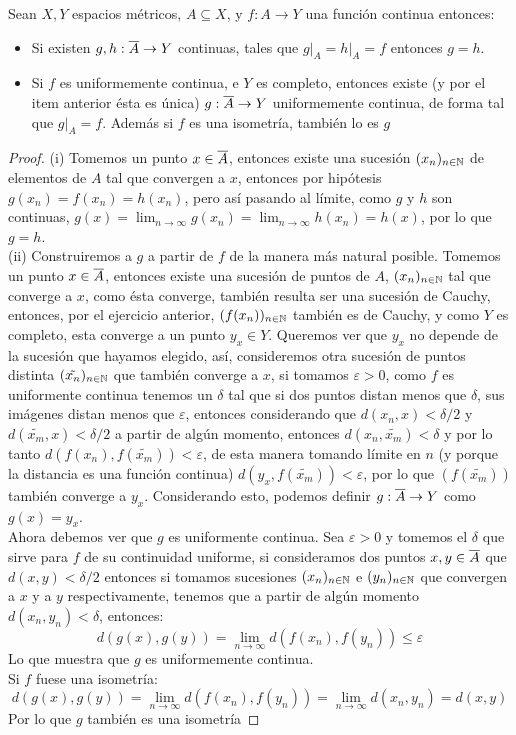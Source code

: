 \documentclass[12pt,a4paper]{book}
\begin{document}
\begin{teo}
Sean $X,Y$ espacios métricos, $A \subseteq X$, y $f:A \rightarrow Y$ una función continua entonces:
\begin{itemize}
\item[i] Si existen $g,h:\overline{A} \rightarrow Y$ continuas, tales que $g\vert_A = h\vert_A = f$ entonces $g = h$.
\item[ii] Si $f$ es uniformemente continua, e $Y$ es completo, entonces existe (y por el item anterior ésta es única) $g : \overline{A} \rightarrow Y$  uniformemente continua, de forma tal que $g\vert_A =f$. Además si $f$ es una isometría, también lo es $g$
\end{itemize}
\begin{proof}
(i) Tomemos un punto $x \in \overline{A}$, entonces existe una sucesión $(x_n)_{{n} \in \mathbb{N}}$ de elementos de $A$ tal que convergen a $x$, entonces por hipótesis $g(x_n)=f(x_n)=h(x_n)$, pero así pasando al límite, como $g$ y $h$ son continuas, $g(x) = \displaystyle \lim_{n\to \infty} g(x_n) = \lim_{n\to \infty} h(x_n) = h(x)$, por lo que $g=h$.\\
(ii) Construiremos a $g$ a partir de $f$ de la manera más natural posible. Tomemos un punto $x \in \overline{A}$, entonces existe una sucesión de puntos de $A$, $(x_n)_{{n} \in \mathbb{N}}$ tal que converge a $x$, como ésta converge, también resulta ser una sucesión de Cauchy, entonces, por el ejercicio anterior, $(f(x_n))_{{n} \in \mathbb{N}}$ también es de Cauchy, y como $Y$ es completo, esta converge a un punto $y_x \in Y$. Queremos ver que $y_x$ no depende de la sucesión que hayamos elegido, así, consideremos otra sucesión de puntos distinta $(\tilde{x_n})_{{n} \in \mathbb{N}}$ que también converge a $x$, si tomamos $\varepsilon >0$, como $f$ es uniformente continua tenemos un $\delta$ tal que si dos puntos distan menos que $\delta$, sus imágenes distan menos que $\varepsilon$, entonces considerando que $d(x_n,x)< \delta/2$ y $d(\tilde{x_m},x) < \delta/2$ a partir de algún momento, entonces $d(x_n,\tilde{x_m})<\delta$ y por lo tanto $d(f(x_n),f(\tilde{x_m}))<\varepsilon$, de esta manera tomando límite en $n$ (y porque la distancia es una función continua) $d(y_x,f(\tilde{x_m}))<\varepsilon$, por lo que $(f(\tilde{x_m}))$ también converge a $y_x$. Considerando esto, podemos definir $g:\overline{A} \rightarrow Y$ como $g(x) = y_x$.\\
Ahora debemos ver que $g$ es uniformente continua. Sea $\varepsilon>0$ y tomemos el $\delta$ que sirve para $f$ de su continuidad uniforme, si consideramos dos puntos $x,y \in \overline{A}$ que $d(x,y)<\delta/2$ entonces si tomamos sucesiones $(x_n)_{{n} \in \mathbb{N}}$ e $(y_n)_{{n} \in \mathbb{N}}$ que convergen a $x$ y a $y$ respectivamente, tenemos que a partir de algún momento $d(x_n,y_n)< \delta$, entonces:
$$ d(g(x),g(y)) = \lim_{n \to \infty} d(f(x_n),f(y_n)) \leq \varepsilon$$
Lo que muestra que $g$ es uniformemente continua.\\
Si $f$ fuese una isometría:
$$d(g(x),g(y)) = \lim_{n \to \infty}d(f(x_n),f(y_n)) = \lim_{n \to \infty} d(x_n,y_n) = d(x,y)$$
Por lo que $g$ también es una isometría
\end{proof}
\end{teo}
\end{document}
